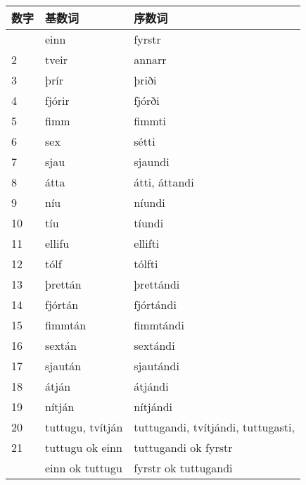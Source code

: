 {{\begin{longtable}{lll}
  \toprule
  数字   & 基数词                   & 序数词                                \\
  \midrule
  \endhead
  \bottomrule
  \endfoot
  1    & einn                  & fyrstr                             \\
  2    & tveir                 & annarr                             \\
  3    & þrír                  & þriði                              \\
  4    & fjórir                & fjórði                             \\
  5    & fimm                  & fimmti                             \\
  6    & sex                   & sétti                              \\
  7    & sjau                  & sjaundi                            \\
  8    & átta                  & átti, áttandi                      \\
  9    & níu                   & níundi                             \\
  10   & tíu                   & tíundi                             \\
  11   & ellifu                & ellifti                            \\
  12   & tólf                  & tólfti                             \\
  13   & þrettán               & þrettándi                          \\
  14   & fjórtán               & fjórtándi                          \\
  15   & fimmtán               & fimmtándi                          \\
  16   & sextán                & sextándi                           \\
  17   & sjaután               & sjautándi                          \\
  18   & átján                 & átjándi                            \\
  19   & nítján                & nítjándi                           \\
  20   & tuttugu, tvítján      & tuttugandi, tvítjándi, tuttugasti, \\
  21   & tuttugu ok einn       & tuttugandi ok fyrstr               \\
       & einn ok tuttugu       & fyrstr ok tuttugandi               \\

\end{longtable}}}
